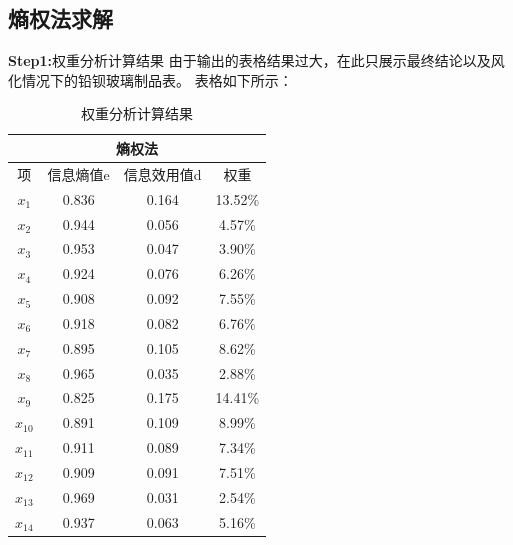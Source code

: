 \documentclass[UTF8]{ctexart}
\begin{document}
                \subsection{熵权法求解}
                \textbf{Step1:}权重分析计算结果
                由于输出的表格结果过大，在此只展示最终结论以及风化情况下的铅钡玻璃制品表。
                表格如下所示：
                \begin{table}[H]
                    \centering
                    \caption{权重分析计算结果}
                    \begin{tabular}{|c|c|c|c|}
                        \hline
                        \multicolumn{4}{|c|}{熵权法}                 \\ \hline
                        项       & 信息熵值e & 信息效用值d & 权重    \\ \hline
                        $x_{1}$  & 0.836     & 0.164       & 13.52\% \\ \hline
                        $x_{2}$  & 0.944     & 0.056       & 4.57\%  \\ \hline
                        $x_{3}$  & 0.953     & 0.047       & 3.90\%  \\ \hline
                        $x_{4}$  & 0.924     & 0.076       & 6.26\%  \\ \hline
                        $x_{5}$  & 0.908     & 0.092       & 7.55\%  \\ \hline
                        $x_{6}$  & 0.918     & 0.082       & 6.76\%  \\ \hline
                        $x_{7}$  & 0.895     & 0.105       & 8.62\%  \\ \hline
                        $x_{8}$  & 0.965     & 0.035       & 2.88\%  \\ \hline
                        $x_{9}$  & 0.825     & 0.175       & 14.41\% \\ \hline
                        $x_{10}$ & 0.891     & 0.109       & 8.99\%  \\ \hline
                        $x_{11}$ & 0.911     & 0.089       & 7.34\%  \\ \hline
                        $x_{12}$ & 0.909     & 0.091       & 7.51\%  \\ \hline
                        $x_{13}$ & 0.969     & 0.031       & 2.54\%  \\ \hline
                        $x_{14}$ & 0.937     & 0.063       & 5.16\%  \\ \hline
                    \end{tabular}
                \end{table}
\end{document}
